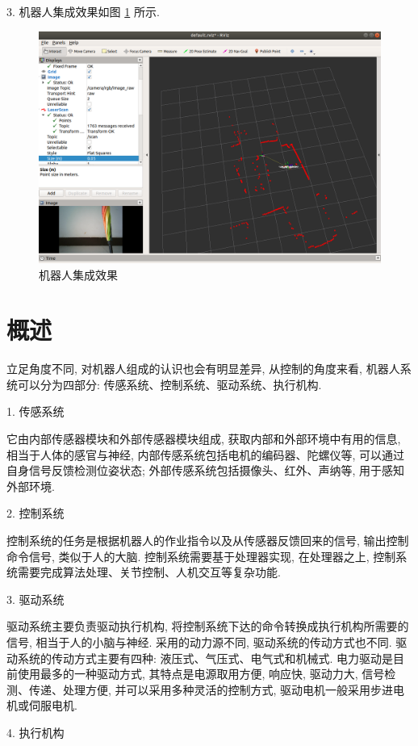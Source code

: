\documentclass[openany, fontset=windowsold]{ctexbook}
\theoremstyle{kaiti}
\theoremstyle{normal}
\begin{document}
3. 机器人集成效果如图 \ref{fig:robot_sim_real_ensemble} 所示.

\begin{figure}[!ht]
  \centering
  \includegraphics[width=.8\textwidth]{robot_sim_real_ensemble.png}
  \caption{机器人集成效果}
  \label{fig:robot_sim_real_ensemble}
\end{figure}

\section{概述}

立足角度不同, 对机器人组成的认识也会有明显差异, 从控制的角度来看, 机器人系统可以分为四部分: 传感系统、控制系统、驱动系统、执行机构.

1. 传感系统

它由内部传感器模块和外部传感器模块组成, 获取内部和外部环境中有用的信息, 相当于人体的感官与神经, 内部传感系统包括电机的编码器、陀螺仪等, 可以通过自身信号反馈检测位姿状态; 外部传感系统包括摄像头、红外、声纳等, 用于感知外部环境.

2. 控制系统

控制系统的任务是根据机器人的作业指令以及从传感器反馈回来的信号, 输出控制命令信号, 类似于人的大脑. 控制系统需要基于处理器实现, 在处理器之上, 控制系统需要完成算法处理、关节控制、人机交互等复杂功能.

3. 驱动系统

驱动系统主要负责驱动执行机构, 将控制系统下达的命令转换成执行机构所需要的信号, 相当于人的小脑与神经. 采用的动力源不同, 驱动系统的传动方式也不同. 驱动系统的传动方式主要有四种: 液压式、气压式、电气式和机械式. 电力驱动是目前使用最多的一种驱动方式, 其特点是电源取用方便, 响应快, 驱动力大, 信号检测、传递、处理方便, 并可以采用多种灵活的控制方式, 驱动电机一般采用步进电机或伺服电机.

4. 执行机构
\end{document}
